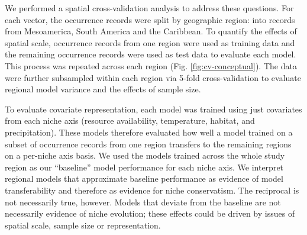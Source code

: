 We performed a spatial cross-validation analysis to address these questions. For each vector, the occurrence records were split by geographic region: into records from Mesoamerica, South America and the Caribbean. To quantify the effects of spatial scale, occurrence records from one region were used as training data and the remaining occurrence records were used as test data to evaluate each model. This process was repeated across each region (Fig. \ref{fig:cv-conceptual}). The data were further subsampled within each region via 5-fold cross-validation to evaluate regional model variance and the effects of sample size.

To evaluate covariate representation, each model was trained using just covariates from each niche axis (resource availability, temperature, habitat, and precipitation). These models therefore evaluated how well a model trained on a subset of occurrence records from one region transfers to the remaining regions on a per-niche axis basis. We used the models trained across the whole study region as our “baseline” model performance for each niche axis. We interpret regional models that approximate baseline performance as evidence of model transferability and therefore as evidence for niche conservatism. The reciprocal is not necessarily true, however. Models that deviate from the baseline are not necessarily evidence of niche evolution; these effects could be driven by issues of spatial scale, sample size or representation.

